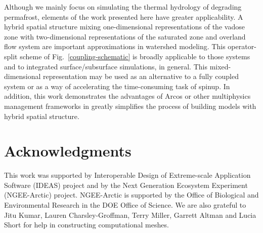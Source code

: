 \documentclass[review]{elsarticle}
\begin{document}
Although we mainly focus on simulating the thermal hydrology of degrading permafrost, elements of the work presented here have greater applicability. A hybrid spatial structure mixing one-dimensional representations of the vadose zone with two-dimensional representations of the saturated zone and overland flow system are important approximations in watershed modeling.  This operator-split scheme of Fig.~\ref{coupling-schematic} is broadly applicable to those systems and to integrated surface/subsurface simulations, in general. This mixed-dimensional representation may be used as an alternative to a fully coupled system or as a way of accelerating the time-consuming task of spinup. In addition, this work demonstrates the advantages of Arcos or other multiphysics management frameworks in greatly simplifies the process of building models with hybrid spatial structure.

\section*{Acknowledgments} 

This work was supported by Interoperable Design of Extreme-scale Application Software (IDEAS) project and by the Next Generation Ecosystem Experiment
(NGEE-Arctic) project. NGEE-Arctic is supported by the Office of Biological and Environmental Research in the DOE Office of Science. We are also
grateful to Jitu Kumar, Lauren Charsley-Groffman, Terry Miller, Garrett Altman and Lucia Short  for help in constructing computational meshes. 


\appendix
\end{document}
